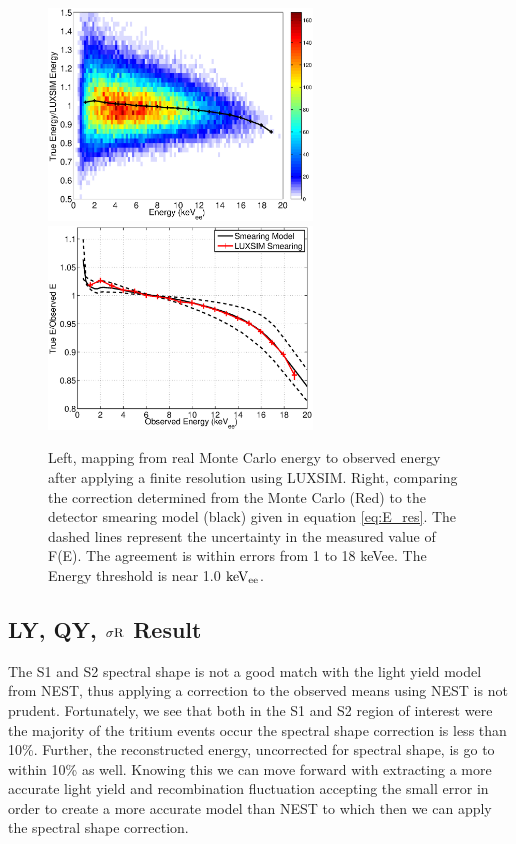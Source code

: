  \begin{figure}[h!]\centering
\includegraphics[width=70mm]{Recombination_LY_QY/Figures/E_density_LUX_SIM_Tritium.eps}
\includegraphics[width=70mm]{Recombination_LY_QY/Figures/E_corr.eps}
\caption{Left, mapping from real Monte Carlo energy to observed energy after applying a finite resolution using LUXSIM. Right, comparing the correction determined from the Monte Carlo (Red) to the detector smearing model (black) given in equation \ref{eq:E_res}. The dashed lines represent the uncertainty in the measured value of F(E). The agreement is within errors from 1 to 18 keVee. The Energy threshold is near 1.0 $\rm keV_{ee}$.}
\label{fig:E_mapping}
\end{figure}

\subsection{LY, QY, $\rm \sigma R$ Result}

 The S1 and S2 spectral shape is not a good match with the light yield model from NEST, thus applying a correction to the observed means using NEST is not prudent. Fortunately, we see that both in the S1 and S2 region of interest were the majority of the tritium events occur the spectral shape correction is less than 10\%. Further, the reconstructed energy, uncorrected for spectral shape, is go to within 10\% as well. Knowing this we can move forward with extracting a more accurate light yield and recombination fluctuation accepting the small error in order to create a more accurate model than NEST to which then we can apply the spectral shape correction.

